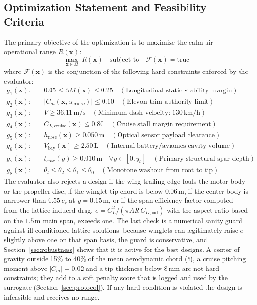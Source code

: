 \subsection{Optimization Statement and Feasibility Criteria}
The primary objective of the optimization is to maximize the calm-air operational range $R(\mathbf{x})$:
\begin{equation}
\max_{\mathbf{x} \in \Omega} \; R(\mathbf{x}) \quad \text{subject to} \quad \mathcal{F}(\mathbf{x}) = \text{true}
\end{equation}
where $\mathcal{F}(\mathbf{x})$ is the conjunction of the following hard constraints enforced by the evaluator:
\begin{align}
g_1(\mathbf{x}): & \quad 0.05 \le SM(\mathbf{x}) \le 0.25 \quad (\text{Longitudinal static stability margin}) \label{eq:con_sm} \\
g_2(\mathbf{x}): & \quad |C_m(\mathbf{x}, \alpha_{\mathrm{cruise}})| \le 0.10 \quad (\text{Elevon trim authority limit}) \label{eq:con_cm} \\
g_3(\mathbf{x}): & \quad V \ge 36.11\,\mathrm{m/s} \quad (\text{Minimum dash velocity: } 130\,\mathrm{km/h}) \label{eq:con_vel} \\
g_4(\mathbf{x}): & \quad C_{L,\mathrm{cruise}}(\mathbf{x}) \le 0.80 \quad (\text{Cruise stall margin requirement}) \label{eq:con_cl} \\
g_5(\mathbf{x}): & \quad h_{\mathrm{nose}}(\mathbf{x}) \ge 0.050\,\mathrm{m} \quad (\text{Optical sensor payload clearance}) \label{eq:con_nose} \\
g_6(\mathbf{x}): & \quad V_{\mathrm{bay}}(\mathbf{x}) \ge 2.50\,\mathrm{L} \quad (\text{Internal battery/avionics cavity volume}) \label{eq:con_vol} \\
g_7(\mathbf{x}): & \quad t_{\mathrm{spar}}(y) \ge 0.010\,\mathrm{m} \quad \forall y \in [0, y_{b}] \quad (\text{Primary structural spar depth}) \label{eq:con_spar} \\
g_8(\mathbf{x}): & \quad \theta_t \le \theta_2 \le \theta_1 \le \theta_0 \quad (\text{Monotone washout from root to tip}) \label{eq:con_washout}
\end{align}
The evaluator also rejects a design if the wing trailing edge fouls the motor body or the propeller disc, if the winglet tip chord is below $0.06\,\mathrm{m}$, if the center body is narrower than $0.55\,c_r$ at $y = 0.15\,\mathrm{m}$, or if the span efficiency factor computed from the lattice induced drag, $e = C_L^2/(\pi A\!R\, C_{D,\mathrm{ind}})$ with the aspect ratio based on the $1.5\,\mathrm{m}$ main span, exceeds one. The last check is a numerical sanity guard against ill-conditioned lattice solutions; because winglets can legitimately raise $e$ slightly above one on that span basis, the guard is conservative, and Section~\ref{sec:robustness} shows that it is active for the best designs. A center of gravity outside 15\% to 40\% of the mean aerodynamic chord ($\bar{c}$), a cruise pitching moment above $|C_m| = 0.02$ and a tip thickness below $8\,\mathrm{mm}$ are not hard constraints; they add to a soft penalty score that is logged and used by the surrogate (Section~\ref{sec:protocol}). If any hard condition is violated the design is infeasible and receives no range.

